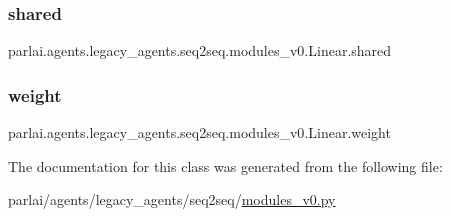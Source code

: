 \subsubsection{\texorpdfstring{shared}{shared}}
{\footnotesize\ttfamily parlai.\+agents.\+legacy\+\_\+agents.\+seq2seq.\+modules\+\_\+v0.\+Linear.\+shared}

\mbox{\label{classparlai_1_1agents_1_1legacy__agents_1_1seq2seq_1_1modules__v0_1_1Linear_ab561a82edc15dcd7509618466d2f684f}} 
\subsubsection{\texorpdfstring{weight}{weight}}
{\footnotesize\ttfamily parlai.\+agents.\+legacy\+\_\+agents.\+seq2seq.\+modules\+\_\+v0.\+Linear.\+weight}



The documentation for this class was generated from the following file\+:\begin{DoxyCompactItemize}
\item 
parlai/agents/legacy\+\_\+agents/seq2seq/\hyperlink{seq2seq_2modules__v0_8py}{modules\+\_\+v0.\+py}\end{DoxyCompactItemize}
